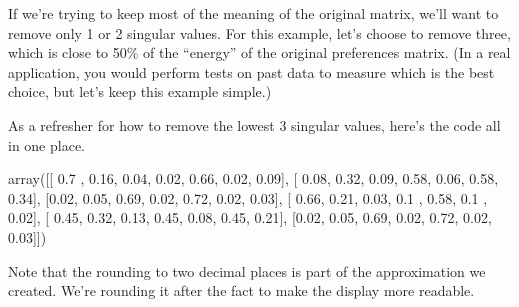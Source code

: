 \documentclass[letterpaper,10pt,english]{jupyterBook}
\begin{document}
\sphinxAtStartPar
If we’re trying to keep most of the meaning of the original matrix, we’ll want to remove only 1 or 2 singular values.  For this example, let’s choose to remove three, which is close to 50\% of the “energy” of the original preferences matrix.  (In a real application, you would perform tests on past data to measure which is the best choice, but let’s keep this example simple.)

\sphinxAtStartPar
As a refresher for how to remove the lowest 3 singular values, here’s the code all in one place.

\begin{sphinxVerbatim}[commandchars=\\\{\}]
    
\PYG{p}{[}\PYG{p}{]}    

     
   

      
   
\end{sphinxVerbatim}

\begin{sphinxVerbatim}[commandchars=\\\{\}]
array([[ 0.7 ,  0.16,  0.04, \PYGZhy{}0.02,  0.66, \PYGZhy{}0.02, \PYGZhy{}0.09],
       [ 0.08,  0.32,  0.09,  0.58, \PYGZhy{}0.06,  0.58,  0.34],
       [\PYGZhy{}0.02,  0.05,  0.69, \PYGZhy{}0.02,  0.72, \PYGZhy{}0.02,  0.03],
       [ 0.66,  0.21,  0.03,  0.1 ,  0.58,  0.1 , \PYGZhy{}0.02],
       [ 0.45,  0.32, \PYGZhy{}0.13,  0.45,  0.08,  0.45,  0.21],
       [\PYGZhy{}0.02,  0.05,  0.69, \PYGZhy{}0.02,  0.72, \PYGZhy{}0.02,  0.03]])
\end{sphinxVerbatim}

\sphinxAtStartPar
Note that the rounding to two decimal places is  part of the approximation we created.  We’re rounding it after the fact to make the display more readable.
\end{document}
